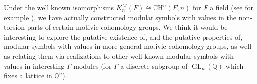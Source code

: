 \documentclass[12pt,amstex,amssymb]{article}
\theoremstyle{plain}
\theoremstyle{definition}
\newtheorem{remark}[theorem]{Remark}
\def\Q{{\mathbb Q}}
\newcommand{\GL}{\operatorname{GL}}
\newcommand{\Dist}{\operatorname{Dist}}
\begin{document}
Under the well known isomorphisms $K_n^M(F) \cong \mathrm{CH}^n(F, n)$ for $F$ a field (see for example \cite[p. 177]{Totaro}), we have actually  constructed modular symbols with values in the non-torsion parts of certain motivic cohomology groups. We think it would be 
interesting to explore the putative existence of, and the putative properties of, modular symbols with values in more general motivic cohomology groups, 
 as well as relating them via  realizations to other well-known modular symbols with values in interesting $\Gamma$-modules (for $\Gamma$ a discrete subgroup of $\GL_n(\Q)$ which fixes a lattice in $\Q^n$).  


\end{document}
